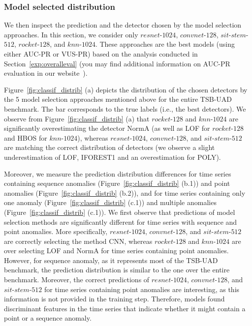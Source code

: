 \subsubsection{\textbf{Model selected distribution}}
\label{exp:distribution}

We then inspect the prediction and the detector chosen by the model selection approaches. In this section, we consider only $resnet$-$1024$, $convnet$-$128$, $sit$-$stem$-$512$, $rocket$-$128$, and $knn$-$1024$. These approaches are the best models (using either AUC-PR or VUS-PR) based on the analysis conducted in Section~\ref{exp:overalleval} (you may find additional information on AUC-PR evaluation in our website~\cite{ourwebsite}).

Figure~\ref{fig:classif_distrib} (a) depicts the distribution of the chosen detectors by the 5 model selection approaches mentioned above for the entire TSB-UAD benchmark. The  bar corresponds to the true labels (i.e., the best detectors). We observe from Figure~\ref{fig:classif_distrib} (a) that $rocket$-$128$ and $knn$-$1024$ are significantly overestimating the detector NormA (as well as LOF for $rocket$-$128$ and HBOS for $knn$-$1024$), whereas $resnet$-$1024$, $convnet$-$128$, and $sit$-$stem$-$512$ are matching the correct distribution of detectors (we observe a slight underestimation of LOF, IFOREST1 and an overestimation for POLY).

Moreover, we measure the prediction distribution differences for time series containing sequence anomalies (Figure~\ref{fig:classif_distrib} (b.1)) and point anomalies (Figure~\ref{fig:classif_distrib} (b.2)), and for time series containing only one anomaly (Figure~\ref{fig:classif_distrib} (c.1)) and multiple anomalies (Figure~\ref{fig:classif_distrib} (c.1)). We first observe that predictions of model selection methods are significantly different for time series with sequence and point anomalies. More specifically, $resnet$-$1024$, $convnet$-$128$, and $sit$-$stem$-$512$ are correctly selecting the method CNN, whereas $rocket$-$128$ and $knn$-$1024$ are over selecting LOF and NormA for time series containing point anomalies. However, for sequence anomaly, as it represents most of the TSB-UAD benchmark, the prediction distribution is similar to the one over the entire benchmark. Moreover, the correct predictions of $resnet$-$1024$, $convnet$-$128$, and $sit$-$stem$-$512$ for time series containing point anomalies are interesting, as this information is not provided in the training step. Therefore,  models found discriminant features in the time series that indicate whether it might contain a point or a sequence anomaly.

